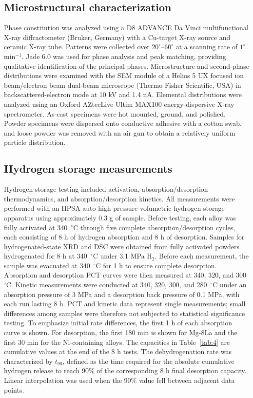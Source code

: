 \documentclass[preprint,12pt]{elsarticle}
\begin{document}
\subsection{Microstructural characterization}
Phase constitution was analyzed using a D8 ADVANCE Da Vinci multifunctional X-ray diffractometer (Bruker, Germany) with a Cu-target X-ray source and ceramic X-ray tube. Patterns were collected over $20^{\circ}$--$60^{\circ}$ at a scanning rate of $1^{\circ}$ min$^{-1}$. Jade 6.0 was used for phase analysis and peak matching, providing qualitative identification of the principal phases. Microstructure and second-phase distributions were examined with the SEM module of a Helios 5 UX focused ion beam/electron beam dual-beam microscope (Thermo Fisher Scientific, USA) in backscattered-electron mode at 10 kV and 1.4 nA. Elemental distributions were analyzed using an Oxford AZtecLive Ultim MAX100 energy-dispersive X-ray spectrometer. As-cast specimens were hot mounted, ground, and polished. Powder specimens were dispersed onto conductive adhesive with a cotton swab, and loose powder was removed with an air gun to obtain a relatively uniform particle distribution.

\subsection{Hydrogen storage measurements}
Hydrogen storage testing included activation, absorption/desorption thermodynamics, and absorption/desorption kinetics. All measurements were performed with an HPSA-auto high-pressure volumetric hydrogen storage apparatus using approximately 0.3 g of sample. Before testing, each alloy was fully activated at 340~$^{\circ}$C through five complete absorption/desorption cycles, each consisting of 8 h of hydrogen absorption and 8 h of desorption. Samples for hydrogenated-state XRD and DSC were obtained from fully activated powders hydrogenated for 8 h at 340~$^{\circ}$C under 3.1 MPa H$_2$. Before each measurement, the sample was evacuated at 340~$^{\circ}$C for 1 h to ensure complete desorption. Absorption and desorption PCT curves were then measured at 340, 320, and 300~$^{\circ}$C. Kinetic measurements were conducted at 340, 320, 300, and 280~$^{\circ}$C under an absorption pressure of 3 MPa and a desorption back pressure of 0.1 MPa, with each run lasting 8 h. PCT and kinetic data represent single measurements; small differences among samples were therefore not subjected to statistical significance testing. To emphasize initial rate differences, the first 1 h of each absorption curve is shown. For desorption, the first 180 min is shown for Mg-8La and the first 30 min for the Ni-containing alloys. The capacities in Table~\ref{tab:4} are cumulative values at the end of the 8 h tests. The dehydrogenation rate was characterized by $t_{90}$, defined as the time required for the absolute cumulative hydrogen release to reach 90\% of the corresponding 8 h final desorption capacity. Linear interpolation was used when the 90\% value fell between adjacent data points.
\end{document}
